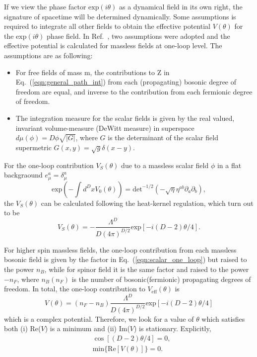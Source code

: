 \documentclass[%
 reprint,
groupedaddress,
showpacs,
 amsmath,amssymb,
 aps,
prb,
]{revtex4-1}
\begin{document}
If we view the phase factor $ \mathrm{exp}(i \theta) $ as a dynamical field in its own right, the signature of spacetime will be determined dynamically. Some assumptions is required to integrate all other fields to obtain the effective potential $ V(\theta) $ for the $ \mathrm{exp}(i \theta) $ phase field. In Ref.~, two assumptions were adopted and the effective potential is calculated for massless fields at one-loop level. The assumptions are as following:
\begin{itemize}
	\item For free fields of mass m, the contributions to Z in
Eq.~(\ref{eqn:general_path_int}) from each (propagating) bosonic degree of freedom
are equal, and inverse to the contribution from each
fermionic degree of freedom.\\
	\item The integration measure for the scalar fields is given by the real valued, invariant volume-measure (DeWitt
measure) in superspace $d \mu(\phi)=D \phi\sqrt{|G| } $, where $G$ is the
determinant of the scalar field supermetric $G(x,y)
=\sqrt g \delta (x -y)$.
\end{itemize}

For the one-loop contribution $V_S( \theta )$ due to a massless scalar field $\phi $ in a flat backgraound $ e^a_\mu = \delta^a_\mu $
\begin{equation}
\label{eqn:scalar_one_loop}
\mathrm{exp} \left (-\int d^D x V_0(\theta) \right ) = \mathrm{det}^{-1/2}(-\sqrt{\eta} \eta^{ab} \partial_a \partial_b ),
\end{equation}
the $ V_S (\theta) $ can be calculated following the heat-kernel regulation,\cite{PhysRevD.49.866} which turn out to be
\begin{equation}
V_S(\theta) = - \frac{\Lambda^D}{D(4 \pi)^{D/2}} \mathrm{exp}[-i(D-2)\theta/4].
\end{equation}

For higher spin massless fields, the one-loop contribution from each massless bosonic field is given by the factor in Eq.~(\ref{eqn:scalar_one_loop}) but raised to the power $ n_B $, while for spinor field it is the same factor and raised to the power $-n_F$, where $n_B(n_F)$ is the number of bosonic(fermionic) propagating degrees of freedom. In total, the one-loop contribution to $V_{\mathrm{eff}}(\theta) $ is
\begin{equation}
V(\theta) = (n_F-n_B)\frac{\Lambda^D}{D(4 \pi)^{D/2}} \mathrm{exp}[-i(D-2)\theta/4]
\end{equation}
which is a complex potential. Therefore, we look for a value of $\theta $ which satisfies both (i) Re($V $) is a minimum and (ii) Im($V$) is stationary. Explicitly,
\begin{eqnarray}
	& \cos [(D-2)\theta/4]=0,\\
	& \mathrm{min} \{ \mathrm{Re} [V(\theta)] \} = 0.
\end{eqnarray}
\end{document}
